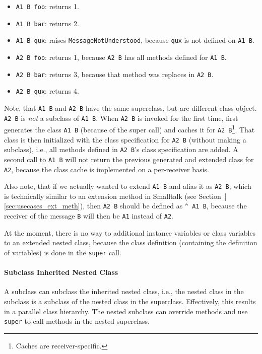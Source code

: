 \begin{itemize}
	\item \texttt{A1 B foo}: returns 1.
	\item \texttt{A1 B bar}: returns 2.
	\item \texttt{A1 B qux}: raises \texttt{MessageNotUnderstood}, because \texttt{qux} is not defined on \texttt{A1 B}.
	\item \texttt{A2 B foo}: returns 1, because \texttt{A2 B} has all methods defined for \texttt{A1 B}.
	\item \texttt{A2 B bar}: returns 3, because that method was replaces in \texttt{A2 B}.
	\item \texttt{A2 B qux}: returns 4.
\end{itemize}

Note, that \texttt{A1 B} and \texttt{A2 B} have the same superclass, but are different class object. \texttt{A2 B} is \emph{not} a subclass of \texttt{A1 B}. When \texttt{A2 B} is invoked for the first time, \msname first generates the class \texttt{A1 B} (because of the super call) and caches it for \texttt{A2 B}\footnote{Caches are receiver-specific.}. That class is then initialized with the class specification for \texttt{A2 B} (without making a subclass), i.e., all methods defined in \texttt{A2 B}'s class specification are added. A second call to \texttt{A1 B} will not return the previous generated and extended class for \texttt{A2}, because the class cache is implemented on a per-receiver basis.

Also note, that if we actually wanted to extend \texttt{A1 B} and alias it as \texttt{A2 B}, which is technically similar to an extension method in Smalltalk (see Section~]\ref{sec:usecases_ext_meth}), then \texttt{A2 B} should be defined as \texttt{\^{} A1 B}, because the receiver of the message \texttt{B} will then be \texttt{A1} instead of \texttt{A2}. 

At the moment, there is no way to additional instance variables or class variables to an extended nested class, because the class definition (containing the definition of variables) is done in the \texttt{super} call. 

\paragraph{Subclass Inherited Nested Class}
A subclass can subclass the inherited nested class, i.e., the nested class in the subclass is a subclass of the nested class in the superclass. Effectively, this results in a parallel class hierarchy. The nested subclass can override methods and use \texttt{super} to call methods in the nested superclass.

